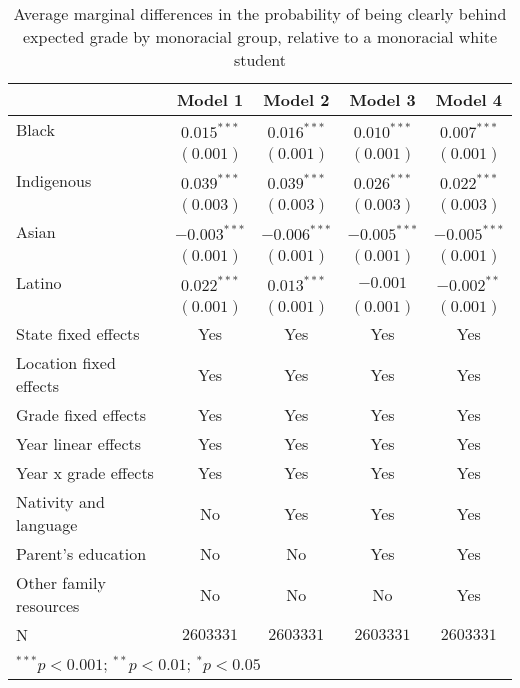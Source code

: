 \documentclass[
  letterpaper,
  DIV=11,
  numbers=noendperiod]{scrartcl}
\begin{document}
\hypertarget{tbl-monoracial}{}
\begin{table}[t]
\caption{\label{tbl-monoracial}Average marginal differences in the probability of being clearly behind
expected grade by monoracial group, relative to a monoracial white
student }
\begin{center}
\begin{tabular}{l c c c c}
\hline
 & Model 1 & Model 2 & Model 3 & Model 4 \\
\hline
Black                  & $0.015^{***}$  & $0.016^{***}$  & $0.010^{***}$  & $0.007^{***}$  \\
                       & $(0.001)$      & $(0.001)$      & $(0.001)$      & $(0.001)$      \\
Indigenous             & $0.039^{***}$  & $0.039^{***}$  & $0.026^{***}$  & $0.022^{***}$  \\
                       & $(0.003)$      & $(0.003)$      & $(0.003)$      & $(0.003)$      \\
Asian                  & $-0.003^{***}$ & $-0.006^{***}$ & $-0.005^{***}$ & $-0.005^{***}$ \\
                       & $(0.001)$      & $(0.001)$      & $(0.001)$      & $(0.001)$      \\
Latino                 & $0.022^{***}$  & $0.013^{***}$  & $-0.001$       & $-0.002^{**}$  \\
                       & $(0.001)$      & $(0.001)$      & $(0.001)$      & $(0.001)$      \\
\hline
State fixed effects    & Yes            & Yes            & Yes            & Yes            \\
Location fixed effects & Yes            & Yes            & Yes            & Yes            \\
Grade fixed effects    & Yes            & Yes            & Yes            & Yes            \\
Year linear effects    & Yes            & Yes            & Yes            & Yes            \\
Year x grade effects   & Yes            & Yes            & Yes            & Yes            \\
Nativity and language  & No             & Yes            & Yes            & Yes            \\
Parent's education     & No             & No             & Yes            & Yes            \\
Other family resources & No             & No             & No             & Yes            \\
N                      & $2603331$      & $2603331$      & $2603331$      & $2603331$      \\
\hline
\multicolumn{5}{l}{\scriptsize{$^{***}p<0.001$; $^{**}p<0.01$; $^{*}p<0.05$}}
\end{tabular}
\label{tbl-monoracial}
\end{center}
\end{table}
\end{document}
